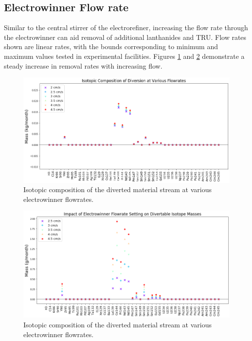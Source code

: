 \subsection{Electrowinner Flow rate}

Similar to the central stirrer of the electrorefiner, increasing the flow rate through the electrowinner can aid removal of additional lanthanides and TRU. Flow rates shown are linear rates, with the bounds corresponding to minimum and maximum values tested in experimental facilities. Figures \ref{fig:win-flow-sa} and \ref{fig:win-flow-diff} demonstrate a steady increase in removal rates with increasing flow.

\begin{figure}
	\includegraphics[width=\linewidth]{images/flowrate-sa-comp}
	\caption{Isotopic composition of the diverted material stream at various electrowinner flowrates.}
	\label{fig:win-flow-sa}
\end{figure}

\begin{figure}
	\includegraphics[width=\linewidth]{images/flowrate-sa-diff}
	\caption{Isotopic composition of the diverted material stream at various electrowinner flowrates.}
	\label{fig:win-flow-diff}
\end{figure}

